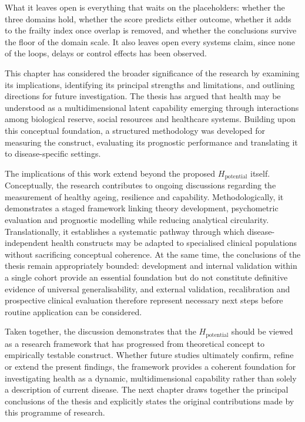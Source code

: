 What it leaves open is everything that waits on the placeholders: whether the three
domains hold, whether the score predicts either outcome, whether it adds to the
frailty index once overlap is removed, and whether the conclusions survive the
floor of the domain scale. It also leaves open every systems claim, since none of
the loops, delays or control effects has been observed.

\noindent This chapter has considered the broader significance of the research by examining its implications, identifying its principal strengths and limitations, and outlining directions for future investigation. The thesis has argued that health may be understood as a multidimensional latent capability emerging through interactions among biological reserve, social resources and healthcare systems. Building upon this conceptual foundation, a structured methodology was developed for measuring the construct, evaluating its prognostic performance and translating it to disease-specific settings.

The implications of this work extend beyond the proposed $H_{\text{potential}}$ itself. Conceptually, the research contributes to ongoing discussions regarding the measurement of healthy ageing, resilience and capability. Methodologically, it demonstrates a staged framework linking theory development, psychometric evaluation and prognostic modelling while reducing analytical circularity. Translationally, it establishes a systematic pathway through which disease-independent health constructs may be adapted to specialised clinical populations without sacrificing conceptual coherence. At the same time, the conclusions of the thesis remain appropriately bounded: development and internal validation within a single cohort provide an essential foundation but do not constitute definitive evidence of universal generalisability, and external validation, recalibration and prospective clinical evaluation therefore represent necessary next steps before routine application can be considered.

Taken together, the discussion demonstrates that the $H_{\text{potential}}$ should be viewed as a research framework that has progressed from theoretical concept to empirically testable construct. Whether future studies ultimately confirm, refine or extend the present findings, the framework provides a coherent foundation for investigating health as a dynamic, multidimensional capability rather than solely a description of current disease. The next chapter draws together the principal conclusions of the thesis and explicitly states the original contributions made by this programme of research.

